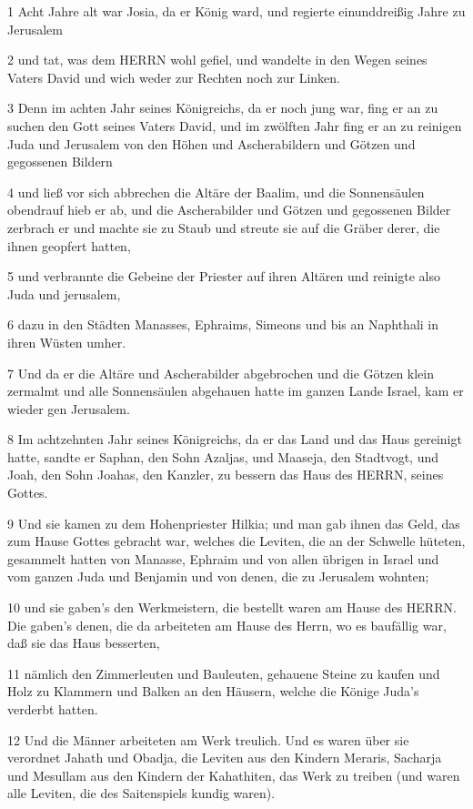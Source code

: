\par 1 Acht Jahre alt war Josia, da er König ward, und regierte einunddreißig Jahre zu Jerusalem
\par 2 und tat, was dem HERRN wohl gefiel, und wandelte in den Wegen seines Vaters David und wich weder zur Rechten noch zur Linken.
\par 3 Denn im achten Jahr seines Königreichs, da er noch jung war, fing er an zu suchen den Gott seines Vaters David, und im zwölften Jahr fing er an zu reinigen Juda und Jerusalem von den Höhen und Ascherabildern und Götzen und gegossenen Bildern
\par 4 und ließ vor sich abbrechen die Altäre der Baalim, und die Sonnensäulen obendrauf hieb er ab, und die Ascherabilder und Götzen und gegossenen Bilder zerbrach er und machte sie zu Staub und streute sie auf die Gräber derer, die ihnen geopfert hatten,
\par 5 und verbrannte die Gebeine der Priester auf ihren Altären und reinigte also Juda und jerusalem,
\par 6 dazu in den Städten Manasses, Ephraims, Simeons und bis an Naphthali in ihren Wüsten umher.
\par 7 Und da er die Altäre und Ascherabilder abgebrochen und die Götzen klein zermalmt und alle Sonnensäulen abgehauen hatte im ganzen Lande Israel, kam er wieder gen Jerusalem.
\par 8 Im achtzehnten Jahr seines Königreichs, da er das Land und das Haus gereinigt hatte, sandte er Saphan, den Sohn Azaljas, und Maaseja, den Stadtvogt, und Joah, den Sohn Joahas, den Kanzler, zu bessern das Haus des HERRN, seines Gottes.
\par 9 Und sie kamen zu dem Hohenpriester Hilkia; und man gab ihnen das Geld, das zum Hause Gottes gebracht war, welches die Leviten, die an der Schwelle hüteten, gesammelt hatten von Manasse, Ephraim und von allen übrigen in Israel und vom ganzen Juda und Benjamin und von denen, die zu Jerusalem wohnten;
\par 10 und sie gaben's den Werkmeistern, die bestellt waren am Hause des HERRN. Die gaben's denen, die da arbeiteten am Hause des Herrn, wo es baufällig war, daß sie das Haus besserten,
\par 11 nämlich den Zimmerleuten und Bauleuten, gehauene Steine zu kaufen und Holz zu Klammern und Balken an den Häusern, welche die Könige Juda's verderbt hatten.
\par 12 Und die Männer arbeiteten am Werk treulich. Und es waren über sie verordnet Jahath und Obadja, die Leviten aus den Kindern Meraris, Sacharja und Mesullam aus den Kindern der Kahathiten, das Werk zu treiben (und waren alle Leviten, die des Saitenspiels kundig waren).
